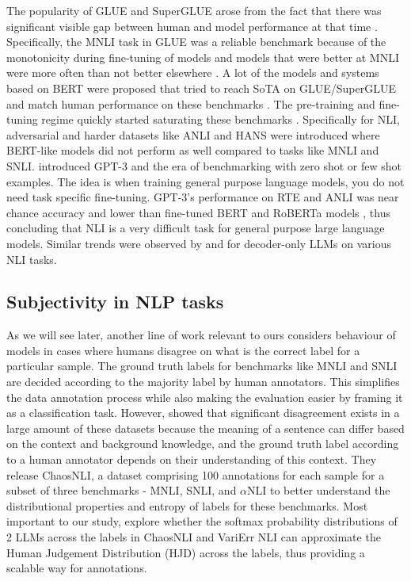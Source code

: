 The popularity of GLUE \citep{wang2019glue} and SuperGLUE \citep{wang2019superglue} arose from the fact that there was significant visible gap between human and model performance at that time \citep{raffel2023t5}.
Specifically, the MNLI task in GLUE was a reliable benchmark because of the monotonicity during fine-tuning of models and models that were better at MNLI were more often than not better elsewhere \citep{raffel2023t5,zaheer2020big}.
A lot of the models and systems based on BERT \citep{devlin2019bert} were proposed that tried to reach SoTA on GLUE/SuperGLUE and match human performance on these benchmarks \citep{he2021deberta,he2021debertav3,patra2022englishcentric}. 
The pre-training and fine-tuning regime quickly started saturating these benchmarks \citep{raffel2023t5}. Specifically for NLI, adversarial and harder datasets like ANLI \citep{nie-etal-2020-adversarial} and HANS \citep{mccoy-etal-2019-right} were introduced where BERT-like models did not perform as well compared to tasks like MNLI and SNLI.
\citet{brown2020language} introduced GPT-3 and the era of benchmarking with zero shot or few shot examples. 
The idea is when training general purpose language models, you do not need task specific fine-tuning. 
GPT-3's performance on RTE and ANLI was near chance accuracy and lower than fine-tuned BERT and RoBERTa models \citep{liu2019roberta}, thus concluding that NLI is a very difficult task for general purpose large language models.
Similar trends were observed by \citet{ohmer2024form} and \citet{weber-etal-2023-mind} for decoder-only LLMs on various NLI tasks. 


\subsection{Subjectivity in NLP tasks}
\label{related:subjectivity}
As we will see later, another line of work relevant to ours considers behaviour of models in cases where humans disagree on what is the correct label for a particular sample. The ground truth labels for benchmarks like MNLI and SNLI are decided according to the majority label by human annotators. This simplifies the data annotation process while also making the evaluation easier by framing it as a classification task. However, \citet{nie-etal-2020-learn} showed that significant disagreement exists in a large amount of these datasets because the meaning of a sentence can differ based on the context and background knowledge, and the ground truth label according to a human annotator depends on their understanding of this context. They release ChaosNLI, a dataset comprising 100 annotations for each sample for a subset of three benchmarks - MNLI, SNLI, and $\alpha$NLI to better understand the distributional properties and entropy of labels for these benchmarks.
Most important to our study, \citet{chen2024seeingbig} explore whether the softmax probability distributions of 2 LLMs across the labels in ChaosNLI \citep{nie-etal-2020-learn} and VariErr NLI \citep{weber-genzel-etal-2024-varierr} can approximate the Human Judgement Distribution (HJD) across the labels, thus providing a scalable way for annotations.
